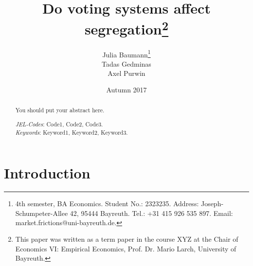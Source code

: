 \documentclass[12pt, a4paper]{article}
\title{{\Large Do voting systems affect segregation\footnote{This paper was written as a term paper in the course XYZ at the Chair of Economics VI: Empirical Economics, Prof. Dr. Mario Larch, University of Bayreuth.}}\\
\vspace{3mm}{\Large Term Paper, Software Engineering for Economists}%
}
\author{Julia Baumann\footnote{4th semester, BA Economics. Student No.: 2323235. Address: Joseph-Schumpeter-Allee 42, 95444 Bayreuth. Tel.: +31 415 926 535 897. Email: market.frictions@uni-bayreuth.de.}\\ Tadas Gedminas\\Axel Purwin}
\date{Autumn 2017}
\begin{document}
\maketitle \thispagestyle{empty}

\begin{abstract}

\setlength{\baselineskip}{10.5pt} 

\vspace{0.5cm} 
\noindent You should put your abstract here. 
\vspace{0.5cm} 

{\normalsize \noindent \emph{JEL-Codes}:  Code1, Code2, Code3.\\ %
\emph{Keywords}: Keyword1, Keyword2, Keyword3.} %
\end{abstract}

\newpage

\thispagestyle{empty}
\tableofcontents
\newpage

\newpage
\thispagestyle{empty}
\listoftables


\newpage
\thispagestyle{empty}
\listoffigures


\newpage


\setcounter{page}{1}%


\section{\label{sec_intro}Introduction}
\end{document}

